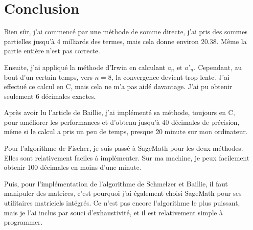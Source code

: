 \section{Conclusion}
Bien s\^{u}r, j'ai commenc\'e par une m\'ethode de somme directe, j'ai pris des
sommes partielles jusqu'\`a 4 milliards des termes, mais cela donne environ
$20.38$. M\^{e}me la partie enti\`ere n'est pas correcte.

Ensuite, j'ai appliqu\'e la m\'ethode d'Irwin en calculant \( a_n \) et \( a'_n
\). Cependant, au bout d'un certain temps, vers \( n = 8 \), la convergence
devient trop lente. J'ai effectu\'e ce calcul en C, mais cela ne m'a pas aid\'e
davantage. J'ai pu obtenir seulement 6 d\'ecimales exactes.

Apr\`es avoir lu l'article de Baillie, j'ai impl\'ement\'e sa m\'ethode,
toujours en C, pour am\'eliorer les performances et d'obtenu jusqu'\`a 40
d\'ecimales de pr\'ecision, m\^eme si le calcul a pris un peu de temps, presque
20 minute sur mon ordinateur.

Pour l'algorithme de Fischer, je suis passé à SageMath pour les deux méthodes.
Elles sont relativement faciles à impl\'ementer. Sur ma machine, je peux
facilement obtenir 100 d\'ecimales en moins d'une minute.

Puis, pour l'impl\'ementation de l'algorithme de Schmelzer et Baillie, il faut
manipuler des matrices, c'est pourquoi j'ai également choisi SageMath pour ses
utilitaires matriciels intégrés. Ce n'est pas encore l'algorithme le plus
puissant, mais je l'ai inclus par souci d'exhaustivité, et il est relativement
simple à programmer.

